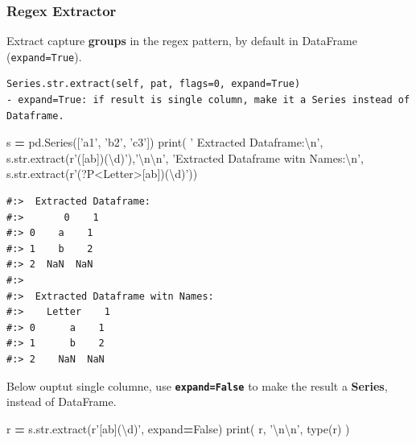 \documentclass[
]{book}
\newenvironment{Shaded}{\begin{snugshade}}{\end{snugshade}}
\newcommand{\BuiltInTok}[1]{#1}
\newcommand{\CharTok}[1]{\textcolor[rgb]{0.5,0.5,0.5}{#1}}
\newcommand{\NormalTok}[1]{#1}
\newcommand{\OperatorTok}[1]{\textcolor[rgb]{0.43,0.43,0.43}{\textbf{#1}}}
\newcommand{\StringTok}[1]{\textcolor[rgb]{0.5,0.5,0.5}{#1}}
\newcommand{\VariableTok}[1]{\textcolor[rgb]{0,0,0}{#1}}
\newcommand{\VerbatimStringTok}[1]{\textcolor[rgb]{0.5,0.5,0.5}{#1}}
\begin{document}
\hypertarget{regex-extractor}{%
\subsubsection{Regex Extractor}\label{regex-extractor}}

Extract capture \textbf{groups} in the regex pattern, by default in DataFrame (\texttt{expand=True}).

\begin{verbatim}
Series.str.extract(self, pat, flags=0, expand=True)
- expand=True: if result is single column, make it a Series instead of Dataframe.
\end{verbatim}

\begin{Shaded}
\begin{Highlighting}[]
\NormalTok{s }\OperatorTok{=}\NormalTok{ pd.Series([}\StringTok{'a1'}\NormalTok{, }\StringTok{'b2'}\NormalTok{, }\StringTok{'c3'}\NormalTok{])}
\BuiltInTok{print}\NormalTok{( }
  \StringTok{' Extracted Dataframe:}\CharTok{\textbackslash{}n}\StringTok{'}\NormalTok{, s.}\BuiltInTok{str}\NormalTok{.extract(}\VerbatimStringTok{r'([ab])(\textbackslash{}d)'}\NormalTok{),}\StringTok{'}\CharTok{\textbackslash{}n\textbackslash{}n}\StringTok{'}\NormalTok{,}
  \StringTok{'Extracted Dataframe witn Names:}\CharTok{\textbackslash{}n}\StringTok{'}\NormalTok{, s.}\BuiltInTok{str}\NormalTok{.extract(}\VerbatimStringTok{r'(?P<Letter>[ab])(\textbackslash{}d)'}\NormalTok{))}
\end{Highlighting}
\end{Shaded}

\begin{verbatim}
#:>  Extracted Dataframe:
#:>       0    1
#:> 0    a    1
#:> 1    b    2
#:> 2  NaN  NaN 
#:> 
#:>  Extracted Dataframe witn Names:
#:>    Letter    1
#:> 0      a    1
#:> 1      b    2
#:> 2    NaN  NaN
\end{verbatim}

Below ouptut single columne, use \textbf{\texttt{expand=False}} to make the result a \textbf{Series}, instead of DataFrame.

\begin{Shaded}
\begin{Highlighting}[]
\NormalTok{r }\OperatorTok{=}\NormalTok{ s.}\BuiltInTok{str}\NormalTok{.extract(}\VerbatimStringTok{r'[ab](\textbackslash{}d)'}\NormalTok{, expand}\OperatorTok{=}\VariableTok{False}\NormalTok{)}
\BuiltInTok{print}\NormalTok{( r, }\StringTok{'}\CharTok{\textbackslash{}n\textbackslash{}n}\StringTok{'}\NormalTok{, }\BuiltInTok{type}\NormalTok{(r) )}
\end{Highlighting}
\end{Shaded}
\end{document}
